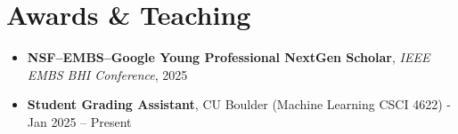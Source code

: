 \documentclass[a4paper,11pt]{article}
\begin{document}
\color{BlueViolet}
\section{Awards \& Teaching}
\color{black}
\begin{itemize}[nosep, after=\strut, leftmargin=1.2em, itemsep=2pt]
  \item \textbf{NSF--EMBS--Google Young Professional NextGen Scholar}, \textit{IEEE EMBS BHI Conference}, 2025
  \item \textbf{Student Grading Assistant}, CU Boulder (Machine Learning CSCI 4622) - Jan 2025 – Present
\end{itemize}

\vfill
\end{document}
